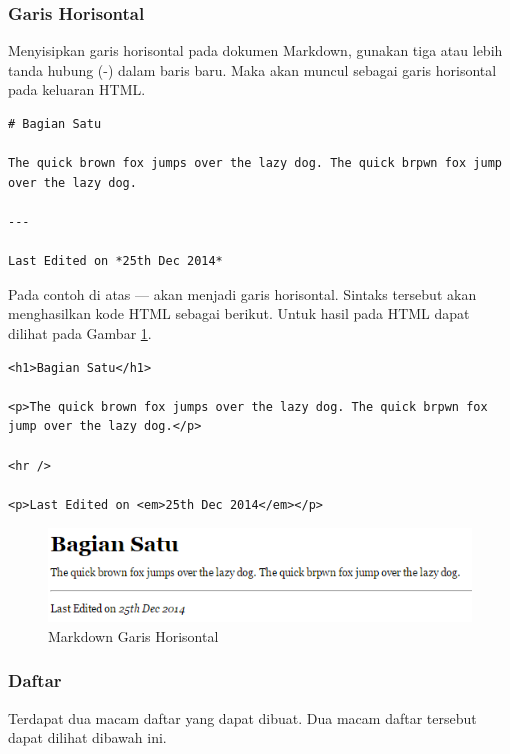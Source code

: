 \subsubsection{Garis Horisontal}
Menyisipkan garis horisontal pada dokumen Markdown, gunakan tiga atau lebih
tanda hubung (-) dalam baris baru. Maka akan muncul sebagai garis horisontal
pada keluaran HTML.
\begin{lstlisting}
# Bagian Satu

The quick brown fox jumps over the lazy dog. The quick brpwn fox jump over the lazy dog.

---

Last Edited on *25th Dec 2014*
\end{lstlisting}
Pada contoh di atas --- akan menjadi garis horisontal. Sintaks tersebut akan
menghasilkan kode HTML sebagai berikut. Untuk hasil pada HTML dapat dilihat pada
Gambar \ref{fig:garis}.
\begin{lstlisting}
<h1>Bagian Satu</h1>

<p>The quick brown fox jumps over the lazy dog. The quick brpwn fox jump over the lazy dog.</p>

<hr />

<p>Last Edited on <em>25th Dec 2014</em></p>
\end{lstlisting}
\begin{figure}[H]
\centering
\includegraphics[scale=1]{Gambar/garis.png}
\caption[Markdown Garis Horisontal]{Markdown Garis Horisontal}
\label{fig:garis}
\end{figure}

\subsubsection{Daftar}
Terdapat dua macam daftar yang dapat dibuat. Dua macam daftar tersebut dapat
dilihat dibawah ini.

